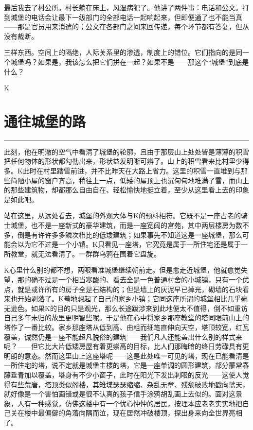 \documentclass[12pt,a4paper]{article}
\begin{document}
最后我去了村公所。村长躺在床上，风湿病犯了。他讲了两件事：电话和公文。打到城堡的电话会让最下一级部门的全部电话一起响起来，但即便通了也不能当真——那是官员用来消遣的；公文在各部门之间来回传递，每个环节都有答复，但从没有裁断。



三样东西。空间上的隔绝，人际关系里的渗透，制度上的错位。它们指向的是同一个城堡吗？如果是，我该怎么把它们拼在一起？如果不是——那这个“城堡”到底是什么？



K

\newpage
\section{通往城堡的路}
\vspace{0.5em}
\vspace{0.3em}

\noindent\rule{\textwidth}{0.4pt}

\vspace{0.3em}



此刻，他在明澈的空气中看清了城堡的轮廓，且由于那层山上处处皆是薄薄的积雪把任何物体的形状都勾勒出来，形状益发明晰可辨了。山上的积雪看来比村里少得多。K此时在村里踏雪前进，并不比昨天在大路上省力。这里的积雪一直堆到与那些简陋小屋的窗户齐高，稍往上一点，低矮的屋顶上也沉甸甸地堆满了雪，而山上的那些建筑物，却都那么自由自在、轻松愉快地挺立着，至少从这里看上去的印象是如此吧。

站在这里，从远处看去，城堡的外观大体与K的预料相符。它既不是一座古老的骑士城堡，也不是一座新式的豪华建筑，而是一座宽阔的宫苑，其中两层楼房为数不多，倒是有许许多多鳞次栉比的低矮建筑；如果事先不知道这是一座城堡，那么可能会以为它不过是一个小镇。K只看见一座塔，它究竟是属于一所住宅还是属于一所教堂，就无法看清了。一群群乌鸦在围着它盘旋。

K心里什么别的都不想，两眼看准城堡继续朝前走。但是愈走近城堡，他就愈觉失望，那的确不过是一个相当寒酸的、看去全是一色普通村舍的小城镇，只有一个优点，就是或许所有的房子全是石结构的；但是墙上的灰泥早已掉光，砌墙的石块看来也开始剥落了。K蓦地想起了自己的家乡小镇；它同这座所谓的城堡相比几乎毫无逊色。如果K的目的只是观光，那么长途跋涉来到此地便太不值得，倒不如重访自己多年未归的故里更明智些呢。于是他在心中将家乡那座教堂的塔同眼前山上的塔作了一番比较。家乡那座塔从低到高、由粗而细笔直伸向天空，塔顶较宽，红瓦覆盖，诚然仍是一座不能超凡脱俗的建筑——我们凡人还能盖出什么别的样式来呢？——但它比大片低矮房屋有着更崇高的目标，比人们那晦暗的终日劳碌具有更明朗的意态。然而这里山上这座塔呢——这是此处唯一可见的塔，现在已能看清是一所住宅的塔，说不定就是城堡主楼的塔，它是一座单调的圆形建筑，部分蒙常春藤垂青加以覆盖，塔身有不少小窗子，此时在阳光下发出刺眼的反光——这使人觉得有些荒唐，塔顶类似阁楼，其雉堞瑟瑟缩缩、杂乱无章、残颓破败地戳向蓝天，就好像是一个害怕画错或是很不认真的孩子信手涂鸦胡乱画上去似的。面对这景象，人有一种感觉，仿佛这楼中有一个忧心忡忡的居民，按理本应老老实实地把自己关在楼中最偏僻的角落向隅而泣，现在居然冲破楼顶，探出身来向全世界亮相了。
\end{document}
